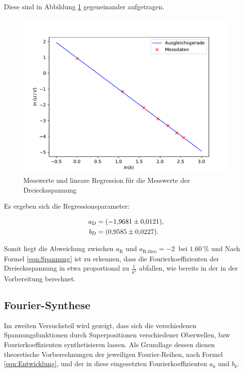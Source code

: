 Diese sind in Abbildung \ref{fig:Drei} gegeneinander aufgetragen. 

\begin{figure}[H]
    \centering
    \includegraphics[scale=1.0]{content/plot3.pdf}
    \caption{Messwerte und lineare Regression für die Messwerte der Dreiecksspannung}
    \label{fig:Drei}
\end{figure}

Es ergeben sich die Regressionsparameter:

\begin{align*}
    a_\text{D} &= \SI{-1.9681 \pm 0.0121}{}, \\
    b_\text{D} &= \SI{0.9585 \pm 0.0227}{}.
\end{align*}

Somit liegt die Abweichung zwischen $a_\text{R}$ und $a_\text{R,theo} = \SI{-2}{}$ bei $\SI{1.60}{\percent}$ und
Nach Formel \eqref{eqn:Spannung} ist zu erkennen, dass die Fourierkoeffizienten der Dreiecksspannung in etwa
proportional zu $\frac{1}{k^2}$ abfallen, wie bereits in der in der Vorbereitung berechnet.


\subsection{Fourier-Synthese}

Im zweiten Versuchsteil wird gezeigt, dass sich die verschiedenen Spannungsfunktionen
durch Superpositionen verschiedener Oberwellen, bzw Fourierkoeffizienten synthetisieren
lassen. Als Grundlage dessen dienen theoretische Vorberechnungen der jeweiligen
Fourier-Reihen, nach Formel \eqref{eqn:Entwicklung}, und der in diese eingesetzten
Fourierkoeffizienten $a_k$ und $b_k$.

